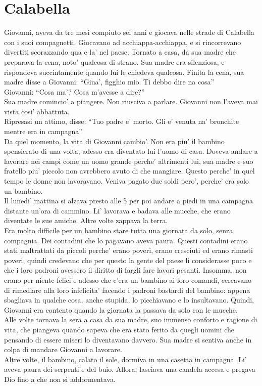 \chapter{Calabella}

Giovanni, aveva da tre mesi compiuto sei anni e giocava nelle strade di Calabella con i suoi compagnetti. Giocavano ad acchiappa-acchiappa, e si rincorrevano divertiti scorazzando qua e la' nel paese. Tornato a casa, da sua madre che preparava la cena, noto' qualcosa di strano. Sua madre era silenziosa, e rispondeva succintamente quando lui le chiedeva qualcosa. Finita la cena, sua madre disse a Giovanni: \enquote{Giua', figghio mio. Ti debbo dire na cosa} \\
Giovanni: \enquote{Cosa ma'? Cosa m'avesse a dire?}\\
Sua madre comincio' a piangere. Non riusciva a parlare. Giovanni non l'aveva mai vista cosi' abbattuta.\\
Ripresasi un attimo, disse: \enquote{Tuo padre e' morto. Gli e' venuta na' bronchite mentre era in campagna}\\

Da quel momento, la vita di Giovanni cambio'. Non era piu' il bambino spensierato di una volta, adesso era diventato lui l'uomo di casa. Doveva andare a lavorare nei campi come un uomo grande perche' altrimenti lui, sua madre e suo fratello piu' piccolo non avrebbero avuto di che mangiare. Questo perche' in quel tempo le donne non lavoravano. Veniva pagato due soldi pero', perche' era solo un bambino.\\
Il lunedi' mattina si alzava presto alle 5 per poi andare a piedi in una campagna distante un'ora di cammino. Li' lavorava e badava alle mucche, che erano diventate le sue amiche. Altre volte zappava la terra.\\
  Era molto difficile per un bambino stare tutta una giornata da solo, senza compagnia. Dei contadini che lo pagavano aveva paura. Questi contadini erano stati maltrattati da piccoli perche' erano poveri, erano cresciuti ed erano rimasti poveri, quindi credevano che per questo la gente del paese li considerasse poco e che i loro padroni avessero il diritto di fargli fare lavori pesanti. Insomma, non erano per niente felici e adesso che c'era un bambino ai loro comandi, cercavano di rimediare alla loro infelicita' facendo i padroni bastardi del bambino: appena sbagliava in qualche cosa, anche stupida, lo picchiavano e lo insultavano. Quindi, Giovanni era contento quando la giornata la passava da solo con le mucche.\\
 Alle volte tornava la sera a casa da sua madre, suo immenso conforto e ragione di vita, che piangeva quando sapeva che era stato ferito da quegli uomini che pensando di essere miseri lo diventavano davvero. Sua madre si sentiva anche in colpa di mandare Giovanni a lavorare.\\
 Altre volte, il bambino, calato il sole, dormiva in una casetta in campagna. Li' aveva paura dei serpenti e del buio. Allora, lasciava una candela accesa e pregava Dio fino a che non si addormentava.\\

